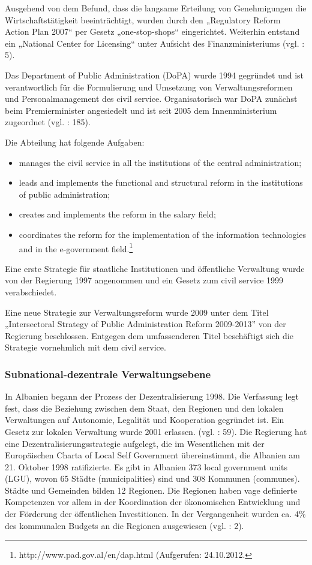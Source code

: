 Ausgehend von dem Befund, dass die langsame Erteilung von Genehmigungen die Wirtschaftstätigkeit beeinträchtigt, wurden durch den „Regulatory Reform Action Plan 2007“ per Gesetz „one-stop-shops“ eingerichtet. Weiterhin entstand ein „National Center for Licensing“ unter Aufsicht des Finanzministeriums (vgl. \cite{oecd08a} : 5).\par
Das Department of Public Administration (DoPA) wurde 1994 gegründet und ist verantwortlich für die Formulierung und Umsetzung von Verwaltungsreformen und Personalmanagement des civil service. Organisatorisch war DoPA zunächst beim Premierminister angesiedelt und ist seit 2005 dem Innenministerium zugeordnet (vgl. \cite{selenica} : 185).\par
Die Abteilung hat folgende Aufgaben:
\begin{itemize} \itemsep1pt \parskip0pt 
\item manages the civil service in all the institutions of the central administration;
\item leads and implements the functional and structural reform in the institutions of public administration;
\item creates and implements the reform in the salary field;
\item coordinates the reform for the implementation of the information technologies and in the e-government field.\footnote{http://www.pad.gov.al/en/dap.html (Aufgerufen: 24.10.2012.}
\end{itemize}
Eine erste Strategie für staatliche Institutionen und öffentliche Verwaltung wurde von der Regierung 1997 angenommen und ein Gesetz zum civil service 1999 verabschiedet.\par
Eine neue Strategie zur Verwaltungsreform wurde 2009 unter dem Titel „Intersectoral Strategy of Public Administration Reform 2009-2013” von der Regierung beschlossen. Entgegen dem umfassenderen Titel beschäftigt sich die Strategie vornehmlich mit dem civil service. 

\subsubsection{Subnational-dezentrale Verwaltungsebene }
In Albanien begann der Prozess der Dezentralisierung 1998. Die Verfassung legt fest, dass die Beziehung zwischen dem Staat, den Regionen und den lokalen Verwaltungen auf Autonomie, Legalität und Kooperation gegründet ist. Ein Gesetz zur lokalen Verwaltung wurde 2001 erlassen. (vgl. \cite{refworld10} : 59). Die Regierung hat eine Dezentralisierungsstrategie aufgelegt, die im Wesentlichen mit der Europäischen Charta of Local Self Government übereinstimmt, die Albanien am 21. Oktober 1998 ratifizierte. Es gibt in Albanien 373 local government units (LGU), wovon 65 Städte (municipalities) sind und 308 Kommunen (communes). Städte und Gemeinden bilden 12 Regionen. Die Regionen haben vage definierte Kompetenzen vor allem in der Koordination der ökonomischen Entwicklung und der Förderung der öffentlichen Investitionen. In der Vergangenheit wurden ca. 4\% des kommunalen Budgets an die Regionen ausgewiesen (vgl. \cite{oecd08a} : 2). \par

